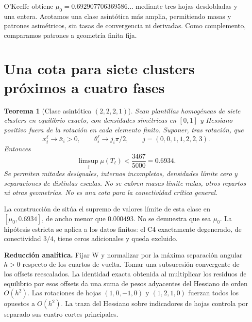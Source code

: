 \documentclass[10pt,a4paper]{article}
\newtheorem{teorema}{Teorema}
\newcommand{\muo}{\mu_0}
\begin{document}
O'Keeffe \cite{okeeffe} obtiene $\muo=0.692907706369586\ldots$ mediante tres hojas desdobladas y una entera. Acotamos una clase asintótica más amplia, permitiendo masas y patrones asimétricos, sin tasas de convergencia ni derivadas. Como complemento, comparamos patrones a geometría finita fija.

\section{Una cota para siete clusters próximos a cuatro fases}
\begin{teorema}[Clase asintótica $(2,2,2,1)$]
Sean plantillas homogéneas de siete clusters en equilibrio exacto, con densidades simétricas en $[0,1]$ y Hessiano positivo fuera de la rotación en cada elemento finito. Suponer, tras rotación, que
\[
 x_i^\ell\longrightarrow\bar x_i>0,\qquad
 \theta_i^\ell\longrightarrow j_i\pi/2,\qquad j=(0,0,1,1,2,2,3).
\]
Entonces
\[
 \boxed{\limsup_\ell\mu(T_\ell)<\frac{3467}{5000}=0.6934.}
\]
Se permiten mitades desiguales, internos incompletos, densidades límite cero y separaciones de distintas escalas. No se cubren masas límite nulas, otros repartos ni otras geometrías. No es una cota para la conectividad crítica general.
\end{teorema}

La construcción de \cite{okeeffe} sitúa el supremo de valores límite de esta clase en $[\muo,0.6934]$, de ancho menor que $0.000493$. No se demuestra que sea $\muo$. La hipótesis estricta se aplica a los datos finitos: el C4 exactamente degenerado, de conectividad $3/4$, tiene ceros adicionales y queda excluido.

\textbf{Reducción analítica.} Fijar W y normalizar por la máxima separación angular $h>0$ respecto de los cuartos de vuelta. Tomar una subsucesión convergente de los offsets reescalados. La identidad exacta obtenida al multiplicar los residuos de equilibrio por esos offsets da una suma de pesos adyacentes del Hessiano de orden $O(h^2)$. Las rotaciones de hojas $(1,0,-1,0)$ y $(1,2,1,0)$ fuerzan todos los opuestos a $O(h^2)$. La traza del Hessiano sobre indicadores de hojas controla por separado sus cuatro cortes principales.
\end{document}
